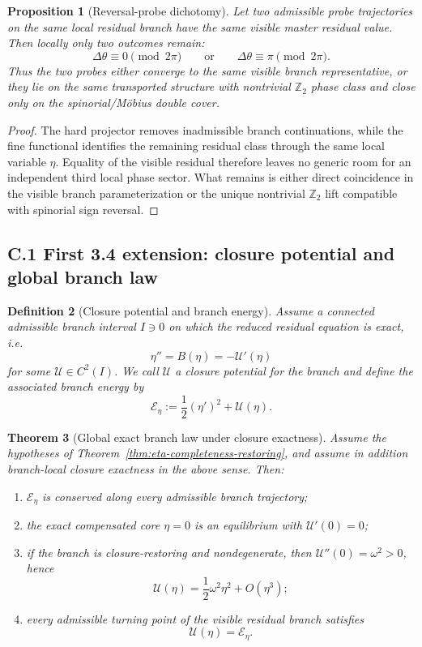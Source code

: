 \documentclass[12pt,a4paper]{article}
\newtheorem{theorem}{Theorem}[section]
\newtheorem{proposition}[theorem]{Proposition}
\newtheorem{definition}[theorem]{Definition}
\begin{document}
\begin{proposition}[Reversal-probe dichotomy]
Let two admissible probe trajectories on the same local residual branch have the same visible master residual value. Then locally only two outcomes remain:
\[
 \Delta\theta\equiv 0 \pmod{2\pi}
 \qquad\text{or}\qquad
 \Delta\theta\equiv \pi \pmod{2\pi}.
\]
Thus the two probes either converge to the same visible branch representative, or they lie on the same transported structure with nontrivial $\mathbb Z_2$ phase class and close only on the spinorial/M\"obius double cover.
\end{proposition}

\begin{proof}
The hard projector removes inadmissible branch continuations, while the fine functional identifies the remaining residual class through the same local variable $\eta$. Equality of the visible residual therefore leaves no generic room for an independent third local phase sector. What remains is either direct coincidence in the visible branch parameterization or the unique nontrivial $\mathbb Z_2$ lift compatible with spinorial sign reversal.
\end{proof}

\subsection*{C.1 First 3.4 extension: closure potential and global branch law}

\begin{definition}[Closure potential and branch energy]
Assume a connected admissible branch interval $I\ni 0$ on which the reduced residual equation is exact, i.e.
\[
 \eta'' = B(\eta) = -\mathcal U'(\eta)
\]
for some $\mathcal U\in C^2(I)$. We call $\mathcal U$ a closure potential for the branch and define the associated branch energy by
\[
 \mathcal E_\eta := \frac12 (\eta')^2 + \mathcal U(\eta).
\]
\end{definition}

\begin{theorem}[Global exact branch law under closure exactness]
\label{thm:global-exact-branch-law}
Assume the hypotheses of Theorem~\ref{thm:eta-completeness-restoring}, and assume in addition branch-local closure exactness in the above sense. Then:
\begin{enumerate}[label=(\roman*)]
 \item $\mathcal E_\eta$ is conserved along every admissible branch trajectory;
 \item the exact compensated core $\eta=0$ is an equilibrium with $\mathcal U'(0)=0$;
 \item if the branch is closure-restoring and nondegenerate, then $\mathcal U''(0)=\omega^2>0$, hence
 \[
 \mathcal U(\eta)=\frac12 \omega^2 \eta^2 + O(\eta^3);
 \]
 \item every admissible turning point of the visible residual branch satisfies
 \[
 \mathcal U(\eta)=\mathcal E_\eta.
 \]
\end{enumerate}
\end{theorem}
\end{document}

